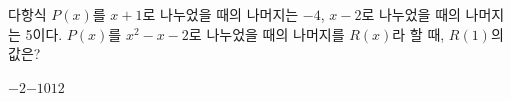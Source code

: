 다항식 $P(x)$를 $x+1$로 나누었을 때의 나머지는 $-4$, $x-2$로 나누었을 때의 나머지는 5이다. $P(x)$를 $x^2-x-2$로 나누었을 때의 나머지를 $R(x)$라 할 때, $R(1)$의 값은?
\begin{choices32}{$-2$}{$-1$}{$0$}{$1$}{$2$}\end{choices32}
